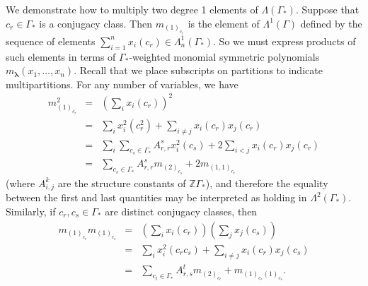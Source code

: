 \documentclass[ALCO,Unicode]{cedram}
\newcommand{\bs}{\boldsymbol}
\newcommand{\LambdaG}{\Lambda(\Gamma_*)}
\newcommand{\LambdaG}{\Lambda(\Gamma_*)}
\begin{document}
\begin{example} \label{degree_2_example}
We demonstrate how to multiply two degree 1 elements of $\LambdaG$. Suppose that $c_r \in \Gamma_*$ is a conjugacy class. Then $m_{(1)_{c_r}}$ is the element of $\Lambda^1(\Gamma)$ defined by the sequence of elements $\sum_{i=1}^n x_i(c_r) \in \Lambda_n^1(\Gamma_*)$. So we must express products of such elements in terms of $\Gamma_*$-weighted monomial symmetric polynomials $m_{\bs\lambda}(x_1, \ldots, x_n)$. Recall that we place subscripts on partitions to indicate multipartitions. For any number of variables, we have
\begin{eqnarray*}
m_{(1)_{c_r}}^2 &=& \left( \sum_i x_i(c_r) \right)^2 \\
&=& \sum_i x_i^2(c_r^2) +  \sum_{i \neq j} x_i(c_r) x_j(c_r) \\
&=& \sum_i \sum_{c_s \in \Gamma_*} A_{r,r}^s x_i^2(c_s) + 2 \sum_{i<j} x_i(c_r) x_j(c_r) \\
&=& \sum_{c_s \in \Gamma_*} A_{r,r}^s m_{(2)_{c_s}} + 2 m_{(1,1)_{c_r}}
\end{eqnarray*}
(where $A_{i,j}^k$ are the structure constants of $\mathbb{Z}\Gamma_*$), and therefore the equality between the first and last quantities may be interpreted as holding in $\Lambda^2(\Gamma_*)$. Similarly, if $c_r,c_s \in \Gamma_*$ are distinct conjugacy classes, then 
\begin{eqnarray*}
m_{(1)_{c_r}}m_{(1)_{c_s}} &=& \left( \sum_i x_i(c_r) \right)\left( \sum_j x_j(c_s) \right) \\
&=& \sum_i x_i^2(c_rc_s) +  \sum_{i \neq j} x_i(c_r) x_j(c_s) \\
&=& \sum_{c_t \in \Gamma_*} A_{r,s}^t m_{(2)_{c_t}} +  m_{(1)_{c_r}(1)_{c_s}}.
\end{eqnarray*}
\end{example}
\end{document}
